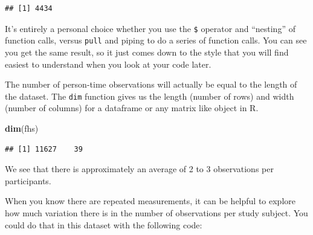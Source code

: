 \documentclass[
]{book}
\newenvironment{Shaded}{\begin{snugshade}}{\end{snugshade}}
\newcommand{\CommentTok}[1]{\textcolor[rgb]{0.56,0.35,0.01}{\textit{#1}}}
\newcommand{\KeywordTok}[1]{\textcolor[rgb]{0.13,0.29,0.53}{\textbf{#1}}}
\newcommand{\NormalTok}[1]{#1}
\newcommand{\OperatorTok}[1]{\textcolor[rgb]{0.81,0.36,0.00}{\textbf{#1}}}
\newcommand{\StringTok}[1]{\textcolor[rgb]{0.31,0.60,0.02}{#1}}
\begin{document}
\begin{Shaded}
\end{Shaded}

\begin{verbatim}
## [1] 4434
\end{verbatim}

It's entirely a personal choice whether you use the \texttt{\$} operator and ``nesting''
of function calls, versus \texttt{pull} and piping to do a series of function calls.
You can see you get the same result, so it just comes down to the style that
you will find easiest to understand when you look at your code later.

The number of person-time observations will actually be equal to the length of the dataset.
The \texttt{dim} function gives us the length (number of rows) and width (number of columns) for a dataframe or any matrix like object in R.

\begin{Shaded}
\begin{Highlighting}[]
\KeywordTok{dim}\NormalTok{(fhs)}
\end{Highlighting}
\end{Shaded}

\begin{verbatim}
## [1] 11627    39
\end{verbatim}

We see that there is approximately an average of 2 to 3 observations per participants.

When you know there are repeated measurements, it can be helpful to explore
how much variation there is in the number of observations per study subject.
You could do that in this dataset with the following code:

\begin{Shaded}
\end{Shaded}
\end{document}

